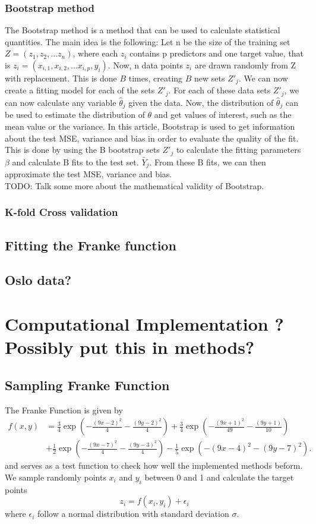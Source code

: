 \documentclass[11pt,a4paper]{article}
\begin{document}
\subsubsection{Bootstrap method}
The Bootstrap method is a method that can be used to calculate statistical quantities. The main idea is the following: Let n be the size of the training set $Z=(z_1,z_2,...z_n)$, where each $z_i$ contains p predictors and one target value, that is $z_i=(x_{i,1},x_{i,2},...x_{i,p},y_i)$. Now, n data points $z_i$ are drawn randomly from Z with replacement. This is done $B$ times, creating $B$ new sets $Z'_j$. We can now create a fitting model for each of the sets  $Z'_j$. For each of these data sets $Z'_j$, we can now calculate any variable $\hat\theta_j$ given the data. Now, the distribution of $\hat\theta_j$ can be used to estimate the distribution of $\theta$ and get values of interest, such as the mean value or the variance. In this article, Bootstrap is used to get information about the test MSE, variance and bias in order to evaluate the quality of the fit. This is done by using the B bootstrap sets $Z'_j$ to calculate the fitting parameters $\beta$ and calculate B fits to the test set. $\tilde{Y_j}$. From these B fits, we can then approximate the test MSE, variance and bias.\\
TODO: Talk some more about the mathematical validity of Bootstrap.
\subsubsection{K-fold Cross validation}
\subsection{Fitting the Franke function}
\subsection{Oslo data?}
\section{Computational Implementation ? Possibly put this in methods?}
\subsection{Sampling Franke Function}
The Franke Function is given by
\begin{align*}
f(x,y) &= \frac{3}{4}\exp{\left(-\frac{(9x-2)^2}{4} - \frac{(9y-2)^2}{4}\right)}+\frac{3}{4}\exp{\left(-\frac{(9x+1)^2}{49}- \frac{(9y+1)}{10}\right)} \\
&+\frac{1}{2}\exp{\left(-\frac{(9x-7)^2}{4} - \frac{(9y-3)^2}{4}\right)} -\frac{1}{5}\exp{\left(-(9x-4)^2 - (9y-7)^2\right) }.
\end{align*}
and serves as a test function to check how well the implemented methods beform.
We sample randomly points $x_i$ and $y_i$ between 0 and 1 and calculate the target points
\begin{equation*}
z_i=f(x_i,y_i)+\epsilon_i
\end{equation*}
where $\epsilon_i$ follow a normal distribution with standard deviation $\sigma$.
\end{document}
